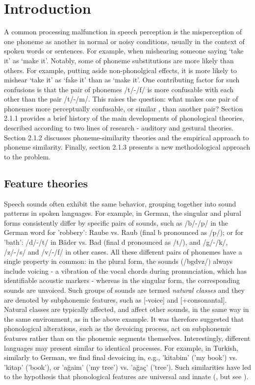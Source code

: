 \section{Introduction}
A common processing malfunction in speech perception is the misperception of one phoneme as another in normal or noisy conditions, usually in the context of spoken words or sentences. For example, when mishearing someone saying ‘take it’ as ‘make it’. Notably, some of phoneme substitutions are more likely than others. For example, putting aside non-phonolgical effects, it is more likely to mishear ‘take it’ as ‘fake it’ than as ‘make it’. One contributing factor for such confusions is that the pair of phonemes /t/-/f/ is more confusable with each other than the pair /t/-/m/. This raises the question: what makes one pair of phonemes more perceptually confusable, or similar \citep{Tversky1977, Shepard1987}, than another pair? Section 2.1.1 provides a brief history of the main developments of phonological theories, described according to two lines of research - auditory and gestural theories. Section 2.1.2 discusses phoneme-similarity theories and the empirical approach to phoneme similarity. Finally, section 2.1.3 presents a new methodological approach to the problem.  

\subsection{Feature theories}
Speech sounds often exhibit the same behavior, grouping together into sound patterns in spoken languages. For example, in German, the singular and plural forms consistently differ by specific pairs of sounds, such as /b/-/p/ in the German word for 'robbery': Raube vs. Raub (final b pronounced as /p/); or for 'bath': /d/-/t/ in  Bäder  vs. Bad (final d pronounced as /t/), and /g/-/k/, /z/-/s/ and /v/-/f/ in other cases. All these different pairs of phonemes have a single property in common: in the plural form, the sounds (/bgdvz/) always include voicing - a vibration of the vocal chords during pronunciation, which has identifiable acoustic markers - whereas in the singular form, the corresponding sounds are unvoiced. Such groups of sounds are termed \textit{natural classes} and they are denoted by subphonemic features, such as [-voice] and [+consonantal]. Natural classes are typically affected, and affect other sounds, in the same way in the same environment, as in the above example. It was therefore suggested that phonological alterations, such as the devoicing process, act on subphonemic features rather than on the phonemic segments themselves. Interestingly, different languages may present similar to identical processes. For example, in Turkish, similarly to German, we find final devoicing in, e.g., 'kitabim' ('my book') vs. 'kitap' ('book'), or 'a\u{g}aim' ('my tree') vs. 'a\u{g}a\c{c}' ('tree'). Such similarities have led to the hypothesis that phonological features are universal and innate (\citealp{ChomskyHalle1968}, but see \citealp{mielke2008emergence}).

